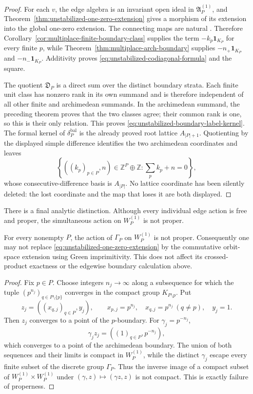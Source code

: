 \begin{proof}
For each $v$, the edge algebra is an invariant open ideal in
$\mathfrak A_P^{(1)}$, and Theorem~\ref{thm:unstabilized-one-zero-extension}
gives a morphism of its extension into the global one-zero extension.  The
connecting maps are natural
\cite[Definition~21.1.1 and Example~21.1.2(a)]{blackadar1986}.  Therefore
Corollary~\ref{cor:multiplace-finite-boundary-class} supplies the term
$-k_p\mathbf1_{K_P}$ for every finite $p$, while
Theorem~\ref{thm:multiplace-arch-boundary} supplies
$-n_+\mathbf1_{K_P}$ and $-n_-\mathbf1_{K_P}$.  Additivity proves
\eqref{eq:unstabilized-codiagonal-formula} and the square.

The quotient $\mathfrak D_P$ is a direct sum over the distinct boundary
strata.  Each finite unit class has nonzero rank in its own summand and is
therefore independent of all other finite and archimedean summands.  In the
archimedean summand, the preceding theorem proves that the two classes agree;
their common rank is one, so this is their only relation.  This proves
\eqref{eq:unstabilized-boundary-label-kernel}.  The formal kernel of
$\delta_P^{\mathrm{bal}}$ is the already proved root lattice
$A_{|P|+1}$.  Quotienting by the displayed simple difference identifies the
two archimedean coordinates and leaves
\[
 \left\{((k_p)_{p\in P},n)\in\mathbb Z^{P}\oplus\mathbb Z:
       \sum_pk_p+n=0\right\},
\]
whose consecutive-difference basis is $A_{|P|}$.  No lattice coordinate has
been silently deleted: the lost coordinate and the map that loses it are
both displayed.
\end{proof}

There is a final analytic distinction.  Although every individual edge action
is free and proper, the simultaneous action on $W_P^{(1)}$ is not proper.

\begin{proposition}
\label{prop:unstabilized-global-action-nonproper}
For every nonempty $P$, the action of $\Gamma_P$ on $W_P^{(1)}$ is not proper.
Consequently one may not replace
\eqref{eq:unstabilized-one-zero-extension} by the commutative orbit-space
extension using Green imprimitivity.  This does not affect its crossed-product
exactness or the edgewise boundary calculation above.
\end{proposition}

\begin{proof}
Fix $p\in P$.  Choose integers $n_j\to\infty$ along a subsequence for which
the tuple $(p^{n_j})_{q\in P\setminus\{p\}}$ converges in the compact group
$K_{P\setminus p}$.  Put
\[
 z_j=((x_{q,j})_{q\in P},y_j),\qquad
 x_{p,j}=p^{n_j},\quad x_{q,j}=p^{n_j}\ (q\ne p),\quad y_j=1.
\]
Then $z_j$ converges to a point of the $p$-boundary.  For
$\gamma_j=p^{-n_j}$,
\[
 \gamma_jz_j=((1)_{q\in P},p^{-n_j}),
\]
which converges to a point of the archimedean boundary.  The union of both
sequences and their limits is compact in $W_P^{(1)}$, while the distinct
$\gamma_j$ escape every finite subset of the discrete group $\Gamma_P$.
Thus the inverse image of a compact subset of
$W_P^{(1)}\times W_P^{(1)}$ under $(\gamma,z)\mapsto(\gamma z,z)$ is not
compact.  This is exactly failure of properness.
\end{proof}

